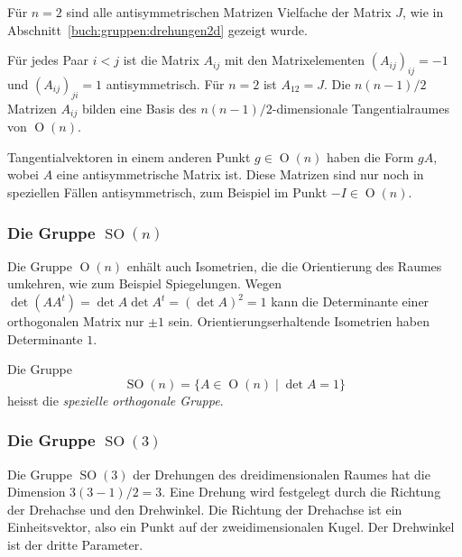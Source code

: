 Für $n=2$ sind alle antisymmetrischen Matrizen Vielfache der Matrix
$J$, wie in Abschnitt~\ref{buch:gruppen:drehungen2d}
gezeigt wurde.

Für jedes Paar $i<j$ ist die Matrix $A_{i\!j}$ mit den Matrixelementen
$(A_{i\!j})_{i\!j}=-1$ und $(A_{i\!j})_{ji}=1$
antisymmetrisch.
Für $n=2$ ist $A_{12}=J$.
Die $n(n-1)/2$ Matrizen $A_{i\!j}$ bilden eine Basis des
$n(n-1)/2$-dimensionale Tangentialraumes von $\operatorname{O}(n)$.

Tangentialvektoren in einem anderen Punkt $g\in\operatorname{O}(n)$
haben die Form $gA$, wobei $A$ eine antisymmetrische Matrix ist.
Diese Matrizen sind nur noch in speziellen Fällen antisymmetrisch,
zum Beispiel im Punkt $-I\in\operatorname{O}(n)$.

\subsubsection{Die Gruppe $\operatorname{SO}(n)$}
Die Gruppe $\operatorname{O}(n)$ enhält auch Isometrien, die
die Orientierung des Raumes umkehren, wie zum Beispiel Spiegelungen.
Wegen $\det (AA^t)=\det A\det A^t = (\det A)^2=1$ kann die Determinante
einer orthogonalen Matrix nur $\pm 1$ sein.
Orientierungserhaltende Isometrien haben Determinante $1$.

\begin{definition}
Die Gruppe
\[
\operatorname{SO}(n)
=
\{A\in\operatorname{O}(n)\;|\; \det A=1\}
\]
heisst die {\em spezielle orthogonale Gruppe}.
%
%
%
%
\end{definition}


\subsubsection{Die Gruppe $\operatorname{SO}(3)$}
Die Gruppe $\operatorname{SO}(3)$ der Drehungen des dreidimensionalen
Raumes hat die Dimension $3(3-1)/2=3$.
Eine Drehung wird festgelegt durch die Richtung der Drehachse und den
Drehwinkel.
Die Richtung der Drehachse ist ein Einheitsvektor, also ein Punkt
auf der zweidimensionalen Kugel.
Der Drehwinkel ist der dritte Parameter.

